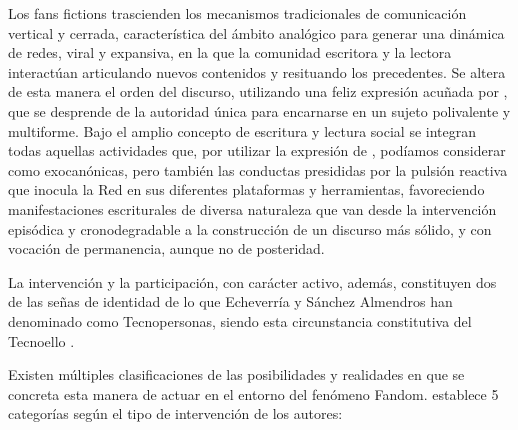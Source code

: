 \documentclass[spanish]{textolivre}
\begin{document}
Los fans fictions trascienden los mecanismos tradicionales de comunicación vertical y cerrada, característica del ámbito analógico para generar una dinámica de redes, viral y expansiva, en la que la comunidad escritora y la lectora interactúan articulando nuevos contenidos y resituando los precedentes. Se altera de esta manera el orden del discurso, utilizando una feliz expresión acuñada por \textcite{chartier_cultura_2019}, que se desprende de la autoridad única para encarnarse en un sujeto polivalente y multiforme. Bajo el amplio concepto de escritura y lectura social se integran todas aquellas actividades que, por utilizar la expresión de \textcite{escandell_exocanonismo_2020}, podíamos considerar como exocanónicas, pero también las conductas presididas por la pulsión reactiva que inocula la Red en sus diferentes plataformas y herramientas, favoreciendo manifestaciones escriturales de diversa naturaleza que van desde la intervención episódica y cronodegradable a la construcción de un discurso más sólido, y con vocación de permanencia, aunque no de posteridad. 

La intervención y la participación, con carácter activo, además, constituyen dos de las señas de identidad de lo que Echeverría y Sánchez Almendros han denominado como Tecnopersonas, siendo esta circunstancia constitutiva del Tecnoello \cite{echeverria_ezponda_tecnopersonas:_2020}. 

Existen múltiples clasificaciones de las posibilidades y realidades en que se concreta esta manera de actuar en el entorno del fenómeno Fandom. \textcite{cruz_martin_fenomeno_2016} establece 5 categorías según el tipo de intervención de los autores:
\end{document}

